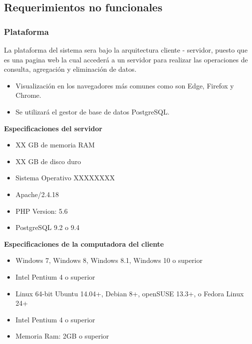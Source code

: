 \subsection{Requerimientos no funcionales}

\subsubsection{Plataforma}
La plataforma del sistema sera bajo la arquitectura cliente - servidor, puesto que es una pagina web la cual accederá a
un servidor para realizar las operaciones de consulta, agregación y eliminación de datos.



\begin{itemize}


    \item Visualización en los navegadores más comunes como son Edge, Firefox y Chrome.
    \item Se utilizará el gestor de base de datos PostgreSQL.
\end{itemize}

\textbf{Especificaciones del servidor}
\begin{itemize}
 \item XX GB  de memoria RAM
 \item XX GB de disco duro
 \item Sistema Operativo XXXXXXXX

 \item Apache/2.4.18
 \item PHP Version: 5.6
 \item PostgreSQL 9.2 o 9.4
\end{itemize}
\textbf{Especificaciones de la computadora del cliente}
\begin{itemize}
\item Windows 7, Windows 8, Windows 8.1, Windows 10 o superior
\item Intel Pentium 4 o superior
\item Linux 64-bit Ubuntu 14.04+, Debian 8+, openSUSE 13.3+, o Fedora Linux 24+
\item Intel Pentium 4 o superior
\item Memoria Ram: 2GB o superior
\end{itemize}